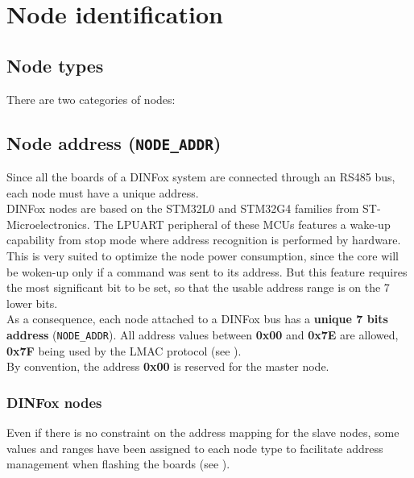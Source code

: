 \section{Node identification}

\subsection{Node types}

There are two categories of nodes:


\subsection{Node address (\texttt{NODE\_ADDR})} \label{node-address}

Since all the boards of a DINFox system are connected through an RS485 bus, each node must have a unique address.
\medskip \\
DINFox nodes are based on the STM32L0 and STM32G4 families from ST-Microelectronics. The LPUART peripheral of these MCUs features a wake-up capability from stop mode where address recognition is performed by hardware. This is very suited to optimize the node power consumption, since the core will be woken-up only if a command was sent to its address. But this feature requires the most significant bit to be set, so that the usable address range is on the 7 lower bits.
\medskip \\
As a consequence, each node attached to a DINFox bus has a \textbf{unique 7 bits address} (\texttt{NODE\_ADDR}). All address values between \textbf{0x00} and \textbf{0x7E} are allowed, \textbf{0x7F} being used by the LMAC protocol (see ).
\medskip \\
By convention, the address \textbf{0x00} is reserved for the master node.

\subsubsection{DINFox nodes}

Even if there is no constraint on the address mapping for the slave nodes, some values and ranges have been assigned to each node type to facilitate address management when flashing the boards (see ).

